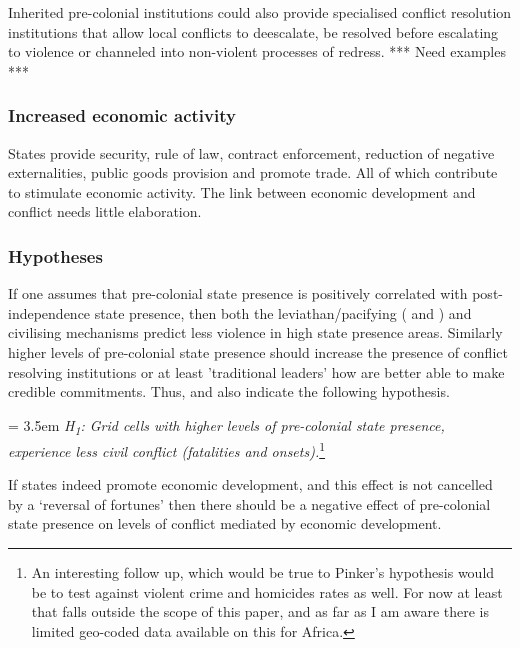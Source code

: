 \documentclass[12pt]{article}
\begin{document}
\begin{multicols}{2}
Inherited pre-colonial institutions could also provide specialised conflict
resolution institutions that allow local conflicts to deescalate, be resolved
before escalating to violence or channeled into non-violent processes of
redress. *** Need examples ***

\subsubsection{Increased economic activity}

States provide security, rule of law, contract enforcement, reduction of
negative externalities, public goods provision and promote trade. All of which
contribute to stimulate economic activity. The link between economic development
and conflict needs little elaboration. 


\subsubsection{Hypotheses}

If one assumes that pre-colonial state presence is positively correlated with
post-independence state presence, then both the leviathan/pacifying
(\citet{Tilly1990} and \citet{Pinker2012}) and civilising \citep{Pinker2012}
mechanisms predict less violence in high state presence areas. Similarly higher
levels of pre-colonial state presence should increase the presence of conflict
resolving institutions or at least 'traditional leaders' how are better able to
make credible commitments. Thus, \citet{Wig2016} and
\citet{Depetris-Chauvin2016} also indicate the following hypothesis.

\bigskip

\hangindent = 3.5em \textit{H\textsubscript{1}: Grid cells with higher levels of
	pre-colonial state presence, experience less civil conflict (fatalities
	and onsets).}\footnote{An interesting follow up, which would be true to
	Pinker's hypothesis would be to test against violent crime and homicides
rates as well. For now at least that falls outside the scope of this paper, and
as far as I am aware there is limited geo-coded data available on this for
Africa.} 

\bigskip

If states indeed promote economic development, and this effect is not cancelled
by a `reversal of fortunes' then there should be a negative effect of
pre-colonial state presence on levels of  conflict mediated by economic
development. 


\end{multicols}
\end{document}
